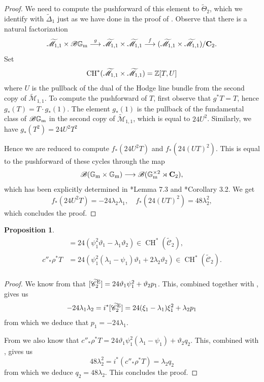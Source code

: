 \documentclass[a4paper, 10pt]{amsart}
\numberwithin{equation}{section}
\numberwithin{subsection}{section}
\newtheorem{proposition}[theorem]{Proposition}
\theoremstyle{definition}
\theoremstyle{remark}
\renewcommand{\mathcal}{\mathscr}
\newcommand\GG{\mathbb{G}} \newcommand\HH{\mathbb{H}}
\newcommand\bC{\mathbf{C}} \newcommand\bD{\mathbf{D}}
\newcommand\rmm{\mathrm{m}} \newcommand\rmn{\mathrm{n}}
\newcommand{\gm}{\GG_{\rmm}}
\newcommand{\Mtilde}{\widetilde{\mathcal M}}
\newcommand{\Ctilde}{\widetilde{\mathcal C}}
\newcommand{\Dtilde}{\widetilde{\Delta}}
\newcommand{\ThTilde}{\widetilde{\Theta}}
\newcommand{\ch}[1][*]{\operatorname{CH}^{#1}}
\begin{document}
\begin{proof}
		We need to compute the pushforward of this element to $\ThTilde_2$, which we identify with $\Dtilde_1$ just as we have done in the proof of . Observe that there is a natural factorization
		\[ \Mtilde_{1,1}\times\cB\gm \overset{g}{\longrightarrow} \Mtilde_{1,1}\times\Mtilde_{1,1} \overset{f}{\longrightarrow} (\Mtilde_{1,1}\times\Mtilde_{1,1})/\bC_2. \]
		Set
		\[ \ch(\Mtilde_{1,1}\times\Mtilde_{1,1}) = \ZZ[T,U] \]
		where $U$ is the pullback of the dual of the Hodge line bundle from the second copy of $\Mtilde_{1,1}$.
		To compute the pushforward of $T$, first observe that $g^*T=T$, hence $g_*(T)=T\cdot g_*(1)$. The element $g_*(1)$ is the pullback of the fundamental class of $\cB\gm$ in the second copy of $\Mtilde_{1,1}$, which is equal to $24U^2$. Similarly, we have $g_*(T^2)=24U^2T^2$
		
		Hence we are reduced to compute $f_*(24U^2T)$ and $f_*(24(UT)^2)$. This is equal to the pushforward of these cycles through the map
		\[ \cB(\gm\times\gm) \longrightarrow \cB(\gm^{\times 2}\rtimes \bC_2), \]
		which has been explicitly determined in \cite{Lars}*{Lemma 7.3} and \cite{DLV}*{Corollary 3.2}. We get
		\[ f_*(24U^2T) = -24\lambda_2\lambda_1, \quad f_*(24(UT)^2)=48\lambda_2^2, \]
		which concludes the proof.
	\end{proof}
	
	\begin{proposition}\label{prop:class Ctilde2 E}
		\begin{align*}
		    [\Ctilde_2^{\rm E}]&= 24(\psi_1^2\vartheta_1-\lambda_1\vartheta_2) \in \ch (\Ctilde_2),\\
		    c''_*\rho^*T &= 24(\psi_1^2(\lambda_1-\psi_1)\vartheta_1 + 2\lambda_2\vartheta_2) \in \ch (\Ctilde_2).\\
		\end{align*}
	\end{proposition}
	\begin{proof}
		We know from  that $[\Ctilde_2^{\rm E}] = 24\vartheta_1\psi_1^2 + \vartheta_2 p_1$. This, combined together with , gives us
		\[ -24\lambda_1\lambda_2 = i^*[\Ctilde_2^{\rm E}] = 24 (\xi_1-\lambda_1)\xi_1^2 + \lambda_2p_1 \]
		from which we deduce that $p_1=-24\lambda_1$.
		
		From  we also know that $c''_*\rho^*T = 24\vartheta_1\psi_1^2(\lambda_1-\psi_1) + \vartheta_2 q_2$. This, combined with , gives us 
		\[ 48\lambda_2^2 = i^*(c''_*\rho^*T) = \lambda_2q_2 \]
		from which we deduce $q_2=48\lambda_2$. This concludes the proof.
	\end{proof}
	
\end{document}
